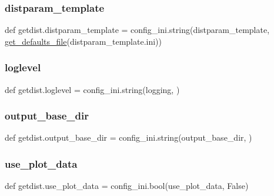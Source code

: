 \mbox{\label{namespacegetdist_a5d4be353cd53f5baa773acef0b256264}} 
\subsubsection{\texorpdfstring{distparam\+\_\+template}{distparam\_template}}
{\footnotesize\ttfamily def getdist.\+distparam\+\_\+template = config\+\_\+ini.\+string(\textquotesingle{}distparam\+\_\+template\textquotesingle{}, \mbox{\hyperlink{namespacegetdist_af1887c8e2da86996dd314d3cecb257dc}{get\+\_\+defaults\+\_\+file}}(\textquotesingle{}distparam\+\_\+template.\+ini\textquotesingle{}))}

\mbox{\label{namespacegetdist_a2cfb6d100005a1aebc5b4e380888ee07}} 
\subsubsection{\texorpdfstring{loglevel}{loglevel}}
{\footnotesize\ttfamily def getdist.\+loglevel = config\+\_\+ini.\+string(\textquotesingle{}logging\textquotesingle{}, \textquotesingle{}\textquotesingle{})}

\mbox{\label{namespacegetdist_abe320c8ae9dc34e1322e80f98e24bebf}} 
\subsubsection{\texorpdfstring{output\+\_\+base\+\_\+dir}{output\_base\_dir}}
{\footnotesize\ttfamily def getdist.\+output\+\_\+base\+\_\+dir = config\+\_\+ini.\+string(\textquotesingle{}output\+\_\+base\+\_\+dir\textquotesingle{}, \textquotesingle{}\textquotesingle{})}

\mbox{\label{namespacegetdist_a9a0a7b564c5c7f59a2f57263aa8a923b}} 
\subsubsection{\texorpdfstring{use\+\_\+plot\+\_\+data}{use\_plot\_data}}
{\footnotesize\ttfamily def getdist.\+use\+\_\+plot\+\_\+data = config\+\_\+ini.\+bool(\textquotesingle{}use\+\_\+plot\+\_\+data\textquotesingle{}, False)}

